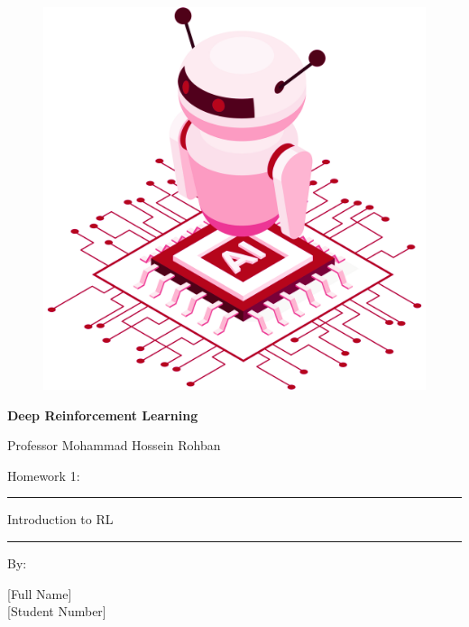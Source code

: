 \documentclass[12pt]{article}
\begin{document}
\thispagestyle{plain}

\begin{center}

\vspace*{-1.5cm}
\begin{figure}[!h]
    \centering
    \includegraphics[width=0.7\linewidth]{figs/cover-std.png}
\end{figure}

{

{\color{DarkBlue} {\fontsize{30}{50} \textbf{
Deep Reinforcement Learning
}}}

{\color{DarkBlue} {\Large
Professor Mohammad Hossein Rohban
}}
}


\vspace{20pt}

{


{\color{RedOrange}
{\Large
Homework 1:
}\\
}
{\color{BrickRed}
\rule{12cm}{0.5pt}

{\Huge
Introduction to RL
}
\rule{12cm}{0.5pt}
}

\vspace{10pt}

{\color{RoyalPurple} { \small By:} } \\
\vspace{10pt}

{\color{Blue} { \LARGE [Full Name] } } \\
\vspace{5pt}
{\color{RoyalBlue} { \Large [Student Number] } }


}
\end{center}
\end{document}
